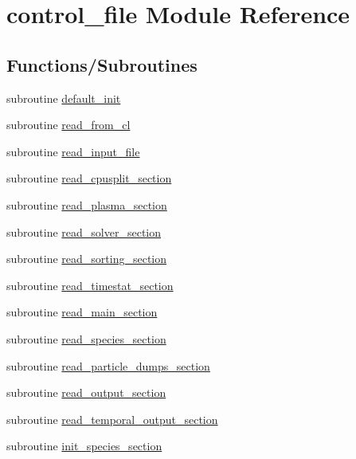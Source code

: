 \hypertarget{namespacecontrol__file}{}\section{control\+\_\+file Module Reference}
\label{namespacecontrol__file}
\subsection*{Functions/\+Subroutines}
\begin{DoxyCompactItemize}
\item 
subroutine \hyperlink{namespacecontrol__file_a80a60361388cc26b8fe06e18e81dc50a}{default\+\_\+init}
\item 
subroutine \hyperlink{namespacecontrol__file_afa9aa95463bcdfe5197ba2ac94793e9f}{read\+\_\+from\+\_\+cl}
\item 
subroutine \hyperlink{namespacecontrol__file_a12ed3f461d585d4199bd6d079a5d74c3}{read\+\_\+input\+\_\+file}
\item 
subroutine \hyperlink{namespacecontrol__file_a488db4847d7ab565187470e915cfcb81}{read\+\_\+cpusplit\+\_\+section}
\item 
subroutine \hyperlink{namespacecontrol__file_ac9b9d61786de32de87c8ddee39a0ac8c}{read\+\_\+plasma\+\_\+section}
\item 
subroutine \hyperlink{namespacecontrol__file_ac65dc6ab5ac3863b22d480b2f9ce1b3b}{read\+\_\+solver\+\_\+section}
\item 
subroutine \hyperlink{namespacecontrol__file_a76aeb0fb2e335ba8495d28bbca1bd6e4}{read\+\_\+sorting\+\_\+section}
\item 
subroutine \hyperlink{namespacecontrol__file_af10502f8b6dd7152860ce78ddc0f4ff3}{read\+\_\+timestat\+\_\+section}
\item 
subroutine \hyperlink{namespacecontrol__file_a88006372b7d91fbde08778111f02fd97}{read\+\_\+main\+\_\+section}
\item 
subroutine \hyperlink{namespacecontrol__file_a76b277dd7c336fdc4ff255f1f1e23365}{read\+\_\+species\+\_\+section}
\item 
subroutine \hyperlink{namespacecontrol__file_abe9d14779d86f200329241b34ba94b33}{read\+\_\+particle\+\_\+dumps\+\_\+section}
\item 
subroutine \hyperlink{namespacecontrol__file_a8beaa20ec4cf16cbc533182a9500f5a3}{read\+\_\+output\+\_\+section}
\item 
subroutine \hyperlink{namespacecontrol__file_a37549c37c459c5e8ffa18cb84a7116f8}{read\+\_\+temporal\+\_\+output\+\_\+section}
\item 
subroutine \hyperlink{namespacecontrol__file_a1cd090a937bb673f043a85221c21f8a7}{init\+\_\+species\+\_\+section}
\end{DoxyCompactItemize}
